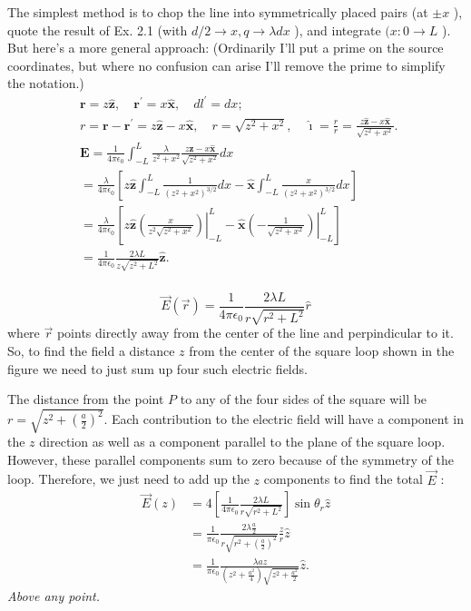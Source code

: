 \documentclass[12pt]{article}
\begin{document}
The simplest method is to chop the line into symmetrically placed pairs (at \(\pm x\) ), quote the result of Ex. 2.1 (with \(d / 2 \rightarrow x, q \rightarrow \lambda d x\) ), and integrate \((x: 0 \rightarrow L\) ). But here's a more general approach: (Ordinarily I’ll put a prime on the source coordinates, but where no confusion can arise I’ll remove the prime to simplify the notation.)
\[
\begin{aligned}
& \mathbf{r}=z \hat{\mathbf{z}}, \quad \mathbf{r}^{\prime}=x \hat{\mathbf{x}}, \quad d l^{\prime}=d x ; \\
& r=\mathbf{r}-\mathbf{r}^{\prime}=z \hat{\mathbf{z}}-x \hat{\mathbf{x}}, \quad r=\sqrt{z^2+x^2}, \quad \hat{\imath}=\frac{r}{r}=\frac{z \hat{\mathbf{z}}-x \hat{\mathbf{x}}}{\sqrt{z^2+x^2}} \text {. } \\
& \mathbf{E}=\frac{1}{4 \pi \epsilon_0} \int_{-L}^L \frac{\lambda}{z^2+x^2} \frac{z \hat{\mathbf{z}}-x \hat{\mathbf{x}}}{\sqrt{z^2+x^2}} d x \\
& =\frac{\lambda}{4 \pi \epsilon_0}\left[z \hat{\mathbf{z}} \int_{-L}^L \frac{1}{\left(z^2+x^2\right)^{3 / 2}} d x-\hat{\mathbf{x}} \int_{-L}^L \frac{x}{\left(z^2+x^2\right)^{3 / 2}} d x\right] \\
& =\frac{\lambda}{4 \pi \epsilon_0}\left[\left.z \hat{\mathbf{z}}\left(\frac{x}{z^2 \sqrt{z^2+x^2}}\right)\right|_{-L} ^L-\left.\hat{\mathbf{x}}\left(-\frac{1}{\sqrt{z^2+x^2}}\right)\right|_{-L} ^L\right] \\
& =\frac{1}{4 \pi \epsilon_0} \frac{2 \lambda L}{z \sqrt{z^2+L^2}} \hat{\mathbf{z}} . \\
&
\end{aligned}
\]


\[
\vec{E}(\vec{r})=\frac{1}{4 \pi \epsilon_0} \frac{2 \lambda L}{r \sqrt{r^2+L^2}} \hat{r}
\]
where \(\vec{r}\) points directly away from the center of the line and perpindicular to it. So, to find the field a distance \(z\) from the center of the square loop shown in the figure we need to just sum up four such electric fields.

The distance from the point \(P\) to any of the four sides of the square will be \(r=\sqrt{z^2+\left(\frac{a}{2}\right)^2}\). Each contribution to the electric field will have a component in the \(z\) direction as well as a component parallel to the plane of the square loop. However, these parallel components sum to zero because of the symmetry of the loop. Therefore, we just need to add up the \(z\) components to find the total \(\vec{E}\) :
\[
\begin{aligned}
\vec{E}(z) & =4\left[\frac{1}{4 \pi \epsilon_0} \frac{2 \lambda L}{r \sqrt{r^2+L^2}}\right] \sin \theta_r \hat{z} \\
& =\frac{1}{\pi \epsilon_0} \frac{2 \lambda \frac{a}{2}}{r \sqrt{r^2+\left(\frac{a}{2}\right)^2}} \frac{z}{r} \hat{z} \\
& =\boxed{\frac{1}{\pi \epsilon_0} \frac{\lambda a z}{\left(z^2+\frac{a^2}{4}\right) \sqrt{z^2+\frac{a^2}{2}}} \hat{z}} .
\end{aligned}
\]
\textit{Above any point.}
\end{document}
